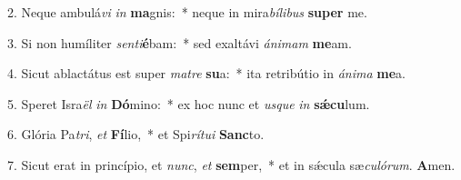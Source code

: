 2. Neque ambulá\textit{vi} \textit{in} \textbf{ma}gnis:~*  neque in mira\textit{bí}\textit{li}\textit{bus} \textbf{su}\textbf{per} me.\

3. Si non humíliter \textit{sen}\textit{ti}\textbf{é}bam:~*  sed exaltávi \textit{á}\textit{ni}\textit{mam} \textbf{me}am.\

4. Sicut ablactátus est super \textit{ma}\textit{tre} \textbf{su}a:~*  ita retribútio in \textit{á}\textit{ni}\textit{ma} \textbf{me}a.\

5. Speret Isra\textit{ël} \textit{in} \textbf{Dó}mino:~*  ex hoc nunc et \textit{us}\textit{que} \textit{in} \textbf{sǽ}\textbf{cu}lum.\

6. Glória Pa\textit{tri}, \textit{et} \textbf{Fí}lio,~*  et Spi\textit{rí}\textit{tu}\textit{i} \textbf{Sanc}to.\

7. Sicut erat in princípio, et \textit{nunc}, \textit{et} \textbf{sem}per,~*  et in sǽcula sæ\textit{cu}\textit{ló}\textit{rum}. \textbf{A}men.\

